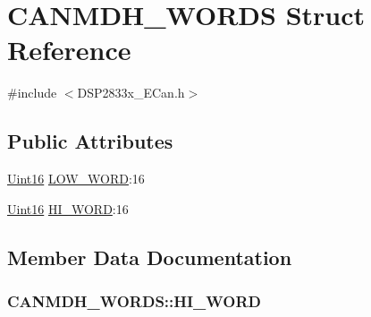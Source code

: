\hypertarget{struct_c_a_n_m_d_h___w_o_r_d_s}{}\section{C\+A\+N\+M\+D\+H\+\_\+\+W\+O\+R\+D\+S Struct Reference}
\label{struct_c_a_n_m_d_h___w_o_r_d_s}


{\ttfamily \#include $<$D\+S\+P2833x\+\_\+\+E\+Can.\+h$>$}

\subsection*{Public Attributes}
\begin{DoxyCompactItemize}
\item 
\hyperlink{_d_s_p2833x___device_8h_a59a9f6be4562c327cbfb4f7e8e18f08b}{Uint16} \hyperlink{struct_c_a_n_m_d_h___w_o_r_d_s_a6dd716ecdc1b8b9bc4c4d6b4353196a4}{L\+O\+W\+\_\+\+W\+O\+R\+D}\+:16
\item 
\hyperlink{_d_s_p2833x___device_8h_a59a9f6be4562c327cbfb4f7e8e18f08b}{Uint16} \hyperlink{struct_c_a_n_m_d_h___w_o_r_d_s_a30c781d9c5d764aaaa8307e4e96057cc}{H\+I\+\_\+\+W\+O\+R\+D}\+:16
\end{DoxyCompactItemize}


\subsection{Member Data Documentation}
\hypertarget{struct_c_a_n_m_d_h___w_o_r_d_s_a30c781d9c5d764aaaa8307e4e96057cc}{}
\subsubsection[{H\+I\+\_\+\+W\+O\+R\+D}]{ C\+A\+N\+M\+D\+H\+\_\+\+W\+O\+R\+D\+S\+::\+H\+I\+\_\+\+W\+O\+R\+D}\label{struct_c_a_n_m_d_h___w_o_r_d_s_a30c781d9c5d764aaaa8307e4e96057cc}
\hypertarget{struct_c_a_n_m_d_h___w_o_r_d_s_a6dd716ecdc1b8b9bc4c4d6b4353196a4}{}
